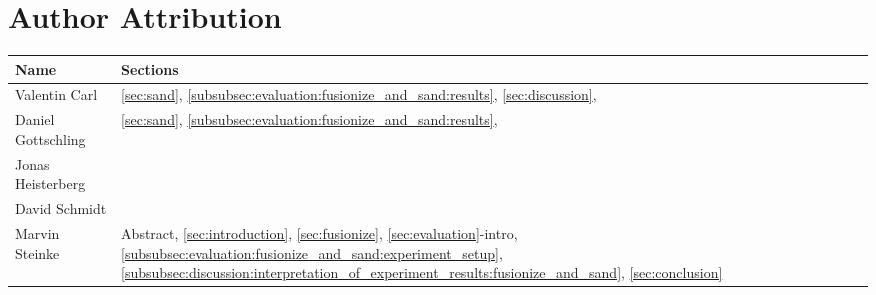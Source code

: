 \documentclass[a4paper, twoside]{IEEEtran}
\begin{document}













\section*{Author Attribution}


\vspace{1em}
\begin{center}
    \begin{tabular}{l l} \toprule
        Name & Sections \\ \midrule
        Valentin Carl &
            \ref{sec:sand},
            \ref{subsubsec:evaluation:fusionize_and_sand:results},
            \ref{sec:discussion},
            \\
        Daniel Gottschling &
            \ref{sec:sand},
            \ref{subsubsec:evaluation:fusionize_and_sand:results},
            \\
        Jonas Heisterberg & \\
        David Schmidt & \\
        Marvin Steinke & \makecell[l]{
            Abstract,
            \ref{sec:introduction},
            \ref{sec:fusionize},
            \ref{sec:evaluation}-intro, \\
            \ref{subsubsec:evaluation:fusionize_and_sand:experiment_setup},
            \ref{subsubsec:discussion:interpretation_of_experiment_results:fusionize_and_sand},
            \ref{sec:conclusion}
        }\\ \bottomrule
    \end{tabular}
\end{center}
\end{document}
